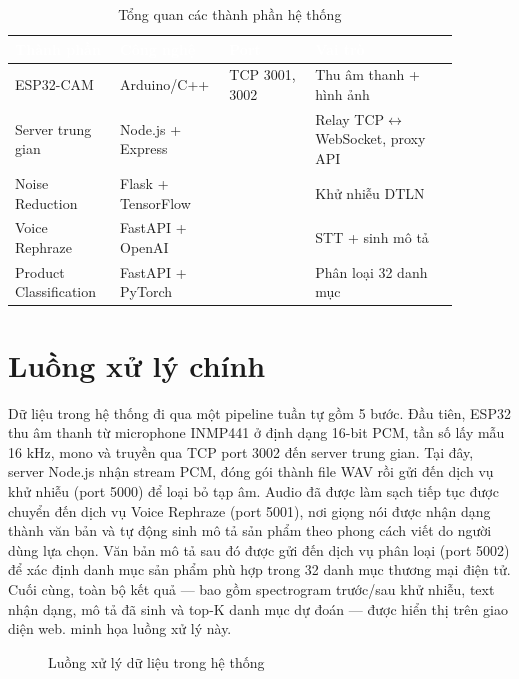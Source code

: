 \begin{table}[htbp]
\centering
\caption{Tổng quan các thành phần hệ thống}
\label{tab:system-overview}
\begin{tabular}{>{\raggedright\arraybackslash}p{0.22\linewidth} >{\centering\arraybackslash}p{0.18\linewidth} >{\centering\arraybackslash}p{0.18\linewidth} >{\raggedright\arraybackslash}p{0.3\linewidth}}
\toprule
\rowcolor{headerblue} \textcolor{white}{\textbf{Thành phần}} & \textcolor{white}{\textbf{Công nghệ}} & \textcolor{white}{\textbf{Port}} & \textcolor{white}{\textbf{Vai trò}} \\
\midrule
\rowcolor{rowgray} ESP32-CAM & Arduino/C++ & TCP 3001, 3002 & Thu âm thanh + hình ảnh \\
Server trung gian & Node.js + Express & 3000 & Relay TCP$\leftrightarrow$WebSocket, proxy API \\
\rowcolor{rowgray} Noise Reduction & Flask + TensorFlow & 5000 & Khử nhiễu DTLN \\
Voice Rephraze & FastAPI + OpenAI & 5001 & STT + sinh mô tả \\
\rowcolor{rowgray} Product Classification & FastAPI + PyTorch & 5002 & Phân loại 32 danh mục \\
\bottomrule
\end{tabular}
\end{table}

\section{Luồng xử lý chính}

Dữ liệu trong hệ thống đi qua một pipeline tuần tự gồm 5 bước. Đầu tiên,
ESP32 thu âm thanh từ microphone INMP441 ở định dạng 16-bit PCM, tần số lấy
mẫu 16 kHz, mono và truyền qua TCP port 3002 đến server trung gian. Tại đây,
server Node.js nhận stream PCM, đóng gói thành file WAV rồi gửi đến dịch vụ
khử nhiễu (port 5000) để loại bỏ tạp âm. Audio đã được làm sạch tiếp tục
được chuyển đến dịch vụ Voice Rephraze (port 5001), nơi giọng nói được nhận
dạng thành văn bản và tự động sinh mô tả sản phẩm theo phong cách viết do
người dùng lựa chọn. Văn bản mô tả sau đó được gửi đến dịch vụ phân loại
(port 5002) để xác định danh mục sản phẩm phù hợp trong 32 danh mục thương
mại điện tử. Cuối cùng, toàn bộ kết quả --- bao gồm spectrogram trước/sau
khử nhiễu, text nhận dạng, mô tả đã sinh và top-K danh mục dự đoán ---
được hiển thị trên giao diện web.
 minh họa luồng xử lý này.

\begin{figure}[htbp]
\centering
{}
\caption{Luồng xử lý dữ liệu trong hệ thống}
\label{fig:data-pipeline}
\end{figure}


